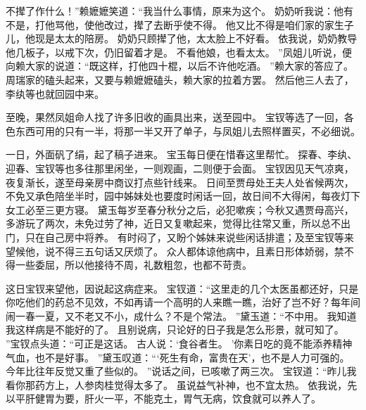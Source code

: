 不撵了作什么！”赖嬷嬷笑道：“我当什么事情，原来为这个。
奶奶听我说：他有不是，打他骂他，使他改过，撵了去断乎使不得。
他又比不得是咱们家的家生子儿，他现是太太的陪房。
奶奶只顾撵了他，太太脸上不好看。
依我说，奶奶教导他几板子，以戒下次，仍旧留着才是。
不看他娘，也看太太。
”凤姐儿听说，便向赖大家的说道：“既这样，打他四十棍，以后不许他吃酒。
”赖大家的答应了。
周瑞家的磕头起来，又要与赖嬷嬷磕头，赖大家的拉着方罢。
然后他三人去了，李纨等也就回园中来。
\par
至晚，果然凤姐命人找了许多旧收的画具出来，送至园中。
宝钗等选了一回，各色东西可用的只有一半，将那一半又开了单子，与凤姐儿去照样置买，不必细说。
\par
一日，外面矾了绢，起了稿子进来。
宝玉每日便在惜春这里帮忙。
探春、李纨、迎春、宝钗等也多往那里闲坐，一则观画，二则便于会面。
宝钗因见天气凉爽，夜复渐长，遂至母亲房中商议打点些针线来。
日间至贾母处王夫人处省候两次，不免又承色陪坐半时，园中姊妹处也要度时闲话一回，故日间不大得闲，每夜灯下女工必至三更方寝。
黛玉每岁至春分秋分之后，必犯嗽疾；今秋又遇贾母高兴，多游玩了两次，未免过劳了神，近日又复嗽起来，觉得比往常又重，所以总不出门，只在自己房中将养。
有时闷了，又盼个姊妹来说些闲话排遣；及至宝钗等来望候他，说不得三五句话又厌烦了。
众人都体谅他病中，且素日形体娇弱，禁不得一些委屈，所以他接待不周，礼数粗忽，也都不苛责。
\par
这日宝钗来望他，因说起这病症来。
宝钗道：“这里走的几个太医虽都还好，只是你吃他们的药总不见效，不如再请一个高明的人来瞧一瞧，治好了岂不好？每年间闹一春一夏，又不老又不小，成什么？不是个常法。
”黛玉道：“不中用。
我知道我这样病是不能好的了。
且别说病，只论好的日子我是怎么形景，就可知了。
”宝钗点头道：“可正是这话。
古人说：‘食谷者生。
’你素日吃的竟不能添养精神气血，也不是好事。
”黛玉叹道：“‘死生有命，富贵在天’，也不是人力可强的。
今年比往年反觉又重了些似的。
”说话之间，已咳嗽了两三次。
宝钗道：“昨儿我看你那药方上，人参肉桂觉得太多了。
虽说益气补神，也不宜太热。
依我说，先以平肝健胃为要，肝火一平，不能克土，胃气无病，饮食就可以养人了。
